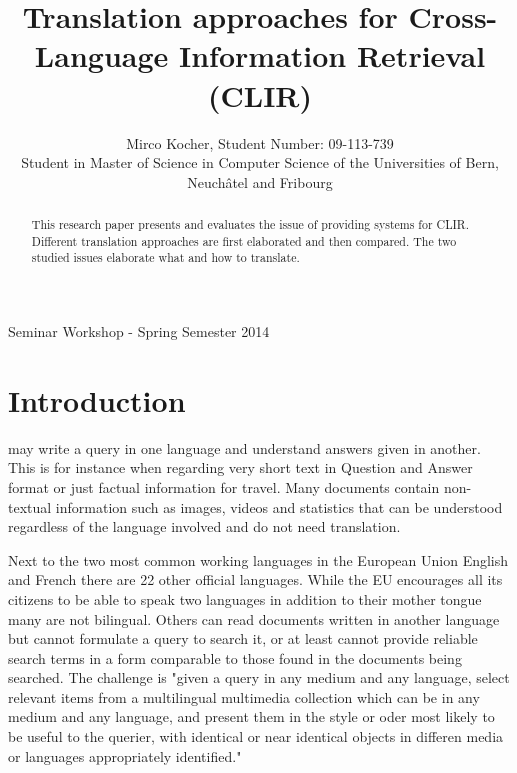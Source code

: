 \documentclass[journal]{IEEEtran}
\begin{document}
\title{ Translation approaches for Cross-Language Information
Retrieval (CLIR)}

\author{Mirco Kocher, Student Number: 09-113-739\\Student in Master of Science in
Computer Science of the Universities of Bern, Neuchâtel and Fribourg}

%
{Seminar Workshop - Spring Semester 2014}

\maketitle


\begin{abstract}
This research paper presents and evaluates the issue of providing
systems for CLIR. Different translation approaches are first elaborated and then compared.
The two studied issues elaborate what and how to translate.
\end{abstract}


\section{Introduction}
 may write a query in one language and understand answers given in another. This is for instance when regarding very short text in Question and Answer format or just factual information for travel. Many documents contain non-textual information such as images, videos and statistics that can be understood regardless of the language involved and do not need translation.

Next to the two most common working languages in the European Union English and French there are 22 other official languages. While the EU encourages all its citizens to be able to speak two languages in addition to their mother tongue many  are not bilingual. \cite{ebs386} Others can read documents written in another language but cannot formulate a query to search it, or at least cannot provide reliable search terms in a form comparable to those found in the documents being searched. The challenge is "given a query in any medium and any language, select relevant items from a multilingual multimedia collection which can be in any medium and any language, and present them in the style or oder most likely to be useful to the querier, with identical or near identical objects in differen media or languages appropriately identified." \cite{oard97}
\end{document}
